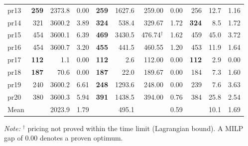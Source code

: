 \begin{table}[!ht]
\begin{tabular*}{\textwidth}{@{\extracolsep\fill}l rrr rrrr rrr@{\extracolsep\fill}}
pr13 & \textbf{259} & 2373.8 & 0.00 & \textbf{259} & 1627.6 & 259.00 & 0.00 & 256 & 12.7 & 1.16 \\
pr14 & 321 & 3600.2 & 3.89 & \textbf{324} & 538.4 & 329.67 & 1.72 & \textbf{324} & 8.5 & 1.72 \\
pr15 & 454 & 3600.1 & 6.39 & \textbf{469} & 3430.5 & 476.74$^{\dagger}$ & 1.62 & 459 & 45.0 & 3.72 \\
pr16 & 454 & 3600.7 & 3.20 & \textbf{455} & 441.5 & 460.55 & 1.20 & 453 & 11.9 & 1.64 \\
pr17 & \textbf{112} & 1.1 & 0.00 & \textbf{112} & 2.6 & 112.00 & 0.00 & \textbf{112} & 2.9 & 0.00 \\
pr18 & \textbf{187} & 70.6 & 0.00 & \textbf{187} & 22.0 & 189.67 & 0.00 & 184 & 7.3 & 1.60 \\
pr19 & 240 & 3600.2 & 6.61 & \textbf{248} & 1293.6 & 248.00 & 0.00 & 239 & 7.6 & 3.63 \\
pr20 & 380 & 3600.3 & 5.94 & \textbf{391} & 1438.5 & 394.00 & 0.76 & 384 & 25.8 & 2.54 \\
\midrule
Mean & & 2023.9 & 1.79 & & 495.1 & & 0.59 & & 10.1 & 1.69 \\
\bottomrule
\end{tabular*}
\begin{tablenotes}
\item {\it Note:} $^{\dagger}$ pricing not proved within the time limit (Lagrangian bound). A MILP gap of 0.00 denotes a proven optimum.
\end{tablenotes}
\end{table}
